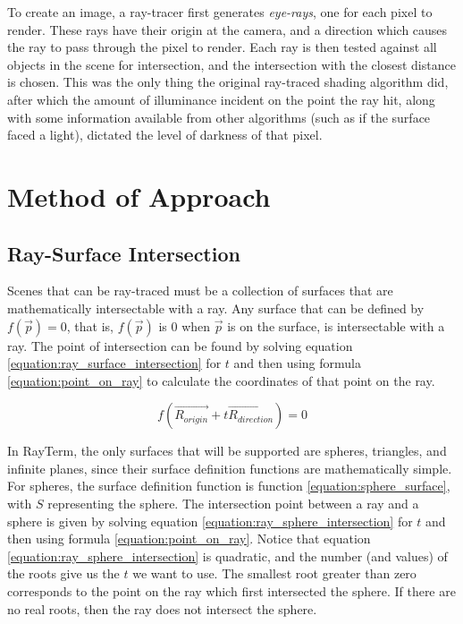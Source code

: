 \documentclass[11pt]{article}
\newcommand{\name}{{\sc RayTerm}}
\newcommand{\rayorg}{\vec{R_{origin}}}
\newcommand{\raydir}{\vec{R_{direction}}}
\begin{document}
To create an image, a ray-tracer first generates {\it eye-rays}, one for each pixel to render.
These rays have their origin at the camera, and a direction which causes the ray to pass through the pixel to render.
Each ray is then tested against all objects in the scene for intersection, and the intersection with the closest distance is chosen.
This was the only thing the original ray-traced shading algorithm \cite{appel1968some} did, after which the amount of illuminance incident on the point the ray hit, along with some information available from other algorithms (such as if the surface faced a light), dictated the level of darkness of that pixel.


\section{Method of Approach}
\label{sec:method}


\subsection{Ray-Surface Intersection}

Scenes that can be ray-traced must be a collection of surfaces that are mathematically intersectable with a ray.
Any surface that can be defined by $f(\vec{p}) = 0$, that is, $f(\vec{p})$ is $0$ when $\vec{p}$ is on the surface, is intersectable with a ray.
The point of intersection can be found by solving equation \ref{equation:ray_surface_intersection} for $t$ and then using formula \ref{equation:point_on_ray} to calculate the coordinates of that point on the ray.

\begin{equation}
  \label{equation:ray_surface_intersection}
  f(\rayorg + t\raydir) = 0
\end{equation}

In \name, the only surfaces that will be supported are spheres, triangles, and infinite planes, since their surface definition functions are mathematically simple.
For spheres, the surface definition function is function \ref{equation:sphere_surface}, with $S$ representing the sphere.
The intersection point between a ray and a sphere is given by solving equation \ref{equation:ray_sphere_intersection} for $t$ and then using formula \ref{equation:point_on_ray}.
Notice that equation \ref{equation:ray_sphere_intersection} is quadratic, and the number (and values) of the roots give us the $t$ we want to use. The smallest root greater than zero corresponds to the point on the ray which first intersected the sphere. If there are no real roots, then the ray does not intersect the sphere.
\end{document}
